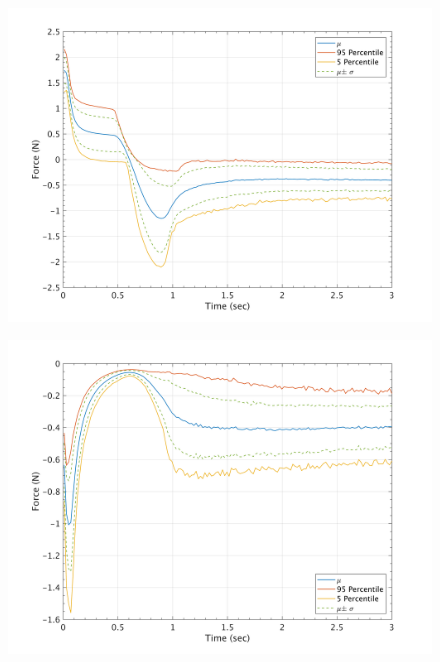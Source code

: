 \documentclass{article}
\begin{document}
\begin{figure}[H]
        \begin{minipage}[b]{0.5\linewidth}
                \centering
                \includegraphics[width=1\textwidth]{InclinedPlane/GlobalRecords/C_Global_Fx.png}
                \label{fig:Ramp-SP-Fx-C}
        \end{minipage}
        \begin{minipage}[b]{0.5\linewidth}
                \centering
                \includegraphics[width=1\textwidth]{InclinedPlane/GlobalRecords/C_Global_Fy.png}
                \label{fig:Ramp-SP-Fy-C}
        \end{minipage}
        

\end{figure}
\end{document}
